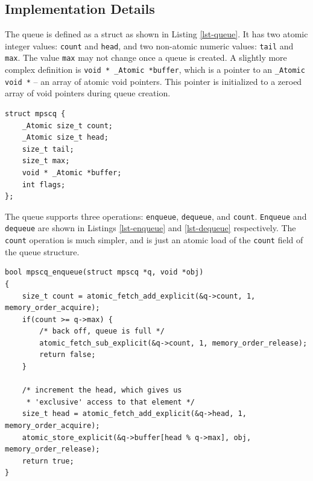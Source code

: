 \documentclass[12pt]{article}
\begin{document}
\subsection{Implementation Details}

The queue is defined as a struct as shown in Listing \ref{lst-queue}. It has two atomic integer values: \texttt{count} and \texttt{head},
and two non-atomic numeric values: \texttt{tail} and \texttt{max}. The value \texttt{max} may not change once a queue is created.
A slightly more complex definition is \texttt{void * \_Atomic *buffer}, which is a pointer to an \texttt{\_Atomic void *} -- an
array of atomic void pointers. This pointer is initialized to a zeroed array of void pointers during queue creation.

	\onehalfspacing
\begin{lstlisting}[label=lst-queue, caption={Definition of queue structure.}]
struct mpscq {
	_Atomic size_t count;
	_Atomic size_t head;
	size_t tail;
	size_t max;
	void * _Atomic *buffer;
	int flags;
};
\end{lstlisting}
	\doublespacing

The queue supports three operations: \texttt{enqueue}, \texttt{dequeue}, and \texttt{count}. \texttt{Enqueue} and \texttt{dequeue} are shown in Listings \ref{lst-enqueue} and \ref{lst-dequeue}
respectively. The \texttt{count} operation is much simpler, and is just an atomic load of the \texttt{count} field of the queue structure.

\begin{minipage}{\linewidth}
	\onehalfspacing
	\vspace{5mm}
	\begin{lstlisting}[label=lst-enqueue, caption={Implementation of \texttt{enqueue} function, with memory orderings.}]
bool mpscq_enqueue(struct mpscq *q, void *obj)
{
	size_t count = atomic_fetch_add_explicit(&q->count, 1, memory_order_acquire);
	if(count >= q->max) {
		/* back off, queue is full */
		atomic_fetch_sub_explicit(&q->count, 1, memory_order_release);
		return false;
	}

	/* increment the head, which gives us
	 * 'exclusive' access to that element */
	size_t head = atomic_fetch_add_explicit(&q->head, 1, memory_order_acquire);
	atomic_store_explicit(&q->buffer[head % q->max], obj, memory_order_release);
	return true;
}

\end{lstlisting}
	\doublespacing
\end{minipage}
\end{document}
